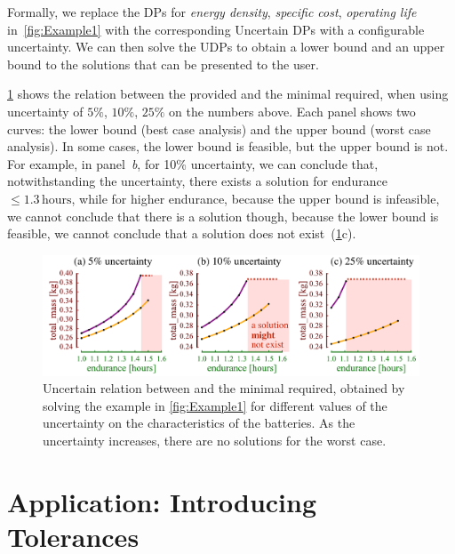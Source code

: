 Formally, we replace the DPs for\emph{ energy density}, \emph{specific
cost}, \emph{operating life} in~\cref{fig:Example1} with the
corresponding Uncertain DPs with a configurable uncertainty. We can
then solve the UDPs to obtain a lower bound and an upper bound to
the solutions that can be presented to the user.

\cref{fig:unc_battery_uncertain} shows the relation between
the provided  and the minimal  required,
when using uncertainty of $5\%$, $10\%$, $25\%$ on the numbers
above. Each panel shows two curves: the lower bound (best case analysis)
and the upper bound (worst case analysis). In some cases, the lower
bound is feasible, but the upper bound is not. For example, in panel~\emph{b},
for 10\% uncertainty, we can conclude that, notwithstanding the uncertainty,
there exists a solution for endurance~$\leq1.3\,\text{hours}$, while
for higher endurance, because the upper bound is infeasible, we cannot
conclude that there is a solution \textemdash{} though, because the
lower bound is feasible, we cannot conclude that a solution does not
exist~(\cref{fig:unc_battery_uncertain}c).
\begin{center}
\begin{figure}[h]
\begin{centering}
\includegraphics[scale=0.33]{unc_battery_uncertain}
\par\end{centering}
\caption{\label{fig:unc_battery_uncertain}Uncertain relation between 
and the minimal  required, obtained by solving the
example in \cref{fig:Example1} for different values of the uncertainty
on the characteristics of the batteries. As the uncertainty increases,
there are no solutions for the worst case.}
\end{figure}
\par\end{center}

\section{Application: Introducing Tolerances\label{sec:Application-tolerance}}

